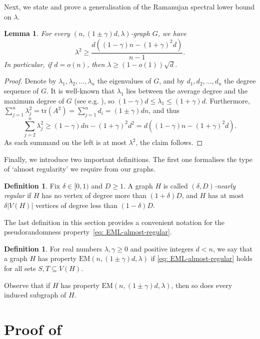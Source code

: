 \documentclass[reqno,a4paper]{amsart}
\newtheorem{lemma}[theorem]{Lemma}
\theoremstyle{definition}
\newtheorem{definition}[theorem]{Definition}
\newcommand{\EM}{\mathrm{EM}}
\begin{document}
Next, we state and prove a generalisation of the Ramanujan spectral lower bound on $\lambda$.

\begin{lemma}\label{l: spectral-lower}
For every $(n,(1\pm \gamma)d,\lambda)$-graph $G$, we have 
\[
    \lambda^2\ge \frac{d((1-\gamma)n-(1+\gamma)^2 d)}{n-1}.
\]
In particular, if $d=o(n)$, then $\lambda\ge (1-o(1))\sqrt d$.
\end{lemma}
\begin{proof}
Denote by $\lambda_1,\lambda_2,\ldots,\lambda_n$ the eigenvalues of $G$, and by $d_1,d_2,\ldots,d_n$ the degree sequence of $G$. 
It is well-known that $\lambda_1$ lies between the average degree and the maximum degree of $G$ (see e.g. \cite[Proposition 3.1.2]{zbMATH05982708}), so $(1-\gamma)d\le \lambda_1\le (1+\gamma)d$. 
Furthermore, $\sum_{j=1}^n\lambda_j^2=\mathrm{tr}(A^2)=\sum_{j=1}^n d_i=(1\pm \gamma)dn$, and thus
\[
    \sum_{j=2}^n\lambda_j^2\ge (1-\gamma)dn-(1+\gamma)^2d^2=d((1-\gamma)n-(1+\gamma)^2d).
\]
As each summand on the left is at most $\lambda^2$, the claim follows.
\end{proof}

Finally, we introduce two important definitions. The first one formalises the type of `almost regularity' we require from our graphs.

\begin{definition}\label{def: reg}
Fix $\delta\in[0,1)$ and $D\ge1$. A graph $H$ is called $(\delta,D)$\emph{-nearly regular} if $H$ has no vertex of degree more than $(1+\delta)D$, and $H$ has at most $\delta |V(H)|$ vertices of degree less than $(1-\delta)D$.
\end{definition}

The last definition in this section provides a convenient notation for the pseudorandomness property~\eqref{eq: EML-almost-regular}.

\begin{definition}\label{def: EML}
For real numbers $\lambda,\gamma\ge 0$ and positive integers $d<n$, we say that a graph $H$ has property $\EM(n,(1\pm\gamma)d,\lambda)$ if \eqref{eq: EML-almost-regular} holds for all sets $S,T\subseteq V(H)$.
\end{definition}

Observe that if $H$ has property $\EM(n,(1\pm\gamma)d,\lambda)$, then so does every induced subgraph of $H$.

\section{Proof of \texorpdfstring{}{Theorem 1.1}}\label{s: proof-main}
\end{document}
